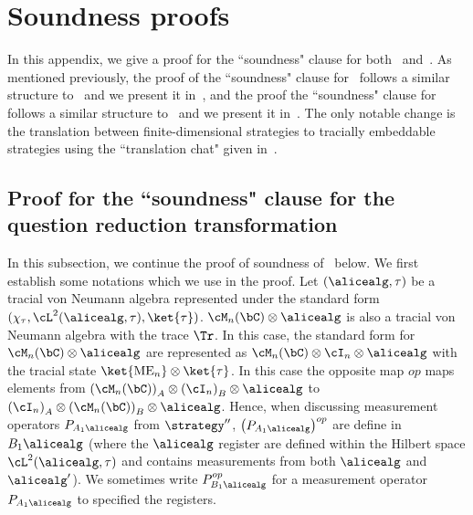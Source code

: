 \section{Soundness proofs}

In this appendix, we give a proof for the ``soundness" clause for both~ and~. As mentioned previously, the proof of the ``soundness" clause for~ follows a similar structure to~\cite[Section 8.4]{jiMIPRE2022a} and we present it in~, and the proof the ``soundness" clause for~ follows a similar structure to~\cite[Section 10.7]{jiMIPRE2022a} and we present it in~. The only notable change is the translation between finite-dimensional strategies to tracially embeddable strategies using the ``translation chat" given in~. 

\subsection{Proof for the ``soundness" clause for the question reduction transformation} \label{sec:QRsoundness}
In this subsection, we continue the proof of soundness of~ below. We first establish some notations which we use in the proof. Let $(\alicealg, \tau)$ be a tracial von Neumann algebra represented under the standard form $(\chi_{\tau}, \cL^2(\alicealg, \tau), \ket{\tau})$. $\cM_n(\bC) \otimes \alicealg$ is also a tracial von Neumann algebra with the trace $\Tr$. In this case, the standard form for $\cM_n(\bC) \otimes \alicealg$ are represented as $\cM_n(\bC) \otimes \cI_n \otimes \alicealg$ with the tracial state $\ket{\text{ME}_n} \otimes \ket{\tau}$. In this case the opposite map $op$ maps elements from $\left(\cM_n(\bC)\right)_A \otimes \left(\cI_n\right)_B \otimes \alicealg$ to $ \left(\cI_n\right)_A \otimes \left(\cM_n(\bC)\right)_B  \otimes \alicealg$. Hence, when discussing measurement operators $P_{A_1 \alicealg}$ from $\strategy''$, $\left(P_{A_1 \alicealg}\right)^{op}$ are define in $B_1 \alicealg$ (where the $\alicealg$ register are defined within the Hilbert space $\cL^2(\alicealg, \tau)$ and contains measurements from both $\alicealg$ and $\alicealg'$). We sometimes write $P^{op}_{B_1 \alicealg}$ for a measurement operator $P_{A_1 \alicealg}$ to specified the registers. 

